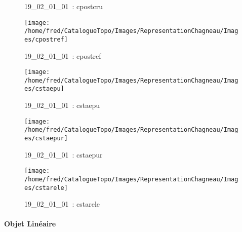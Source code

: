 \documentclass[12pt,titlepage]{book}
\begin{document}
\begin{figure}[h!]
\begin{minipage}[t]{3cm}
\begin{center}
      \caption[~19\_02\_01\_01]{\small{19\_02\_01\_01~:} \tiny{cpostcru}}\label{cpostcru}
    \end{center}
  \end{minipage}
  \begin{minipage}[t]{3cm}
    \begin{center}
      \texttt{[image: /home/fred/CatalogueTopo/Images/RepresentationChagneau/Images/cpostref]}
      \caption[~19\_02\_01\_01]{\small{19\_02\_01\_01~:} \tiny{cpostref}}\label{cpostref}
    \end{center}
  \end{minipage}
  \begin{minipage}[t]{3cm}
    \begin{center}
      \texttt{[image: /home/fred/CatalogueTopo/Images/RepresentationChagneau/Images/cstaepu]}
      \caption[~19\_02\_01\_01]{\small{19\_02\_01\_01~:} \tiny{cstaepu}}\label{cstaepu}
    \end{center}
  \end{minipage}
  \begin{minipage}[t]{3cm}
    \begin{center}
      \texttt{[image: /home/fred/CatalogueTopo/Images/RepresentationChagneau/Images/cstaepur]}
      \caption[~19\_02\_01\_01]{\small{19\_02\_01\_01~:} \tiny{cstaepur}}\label{cstaepur}
    \end{center}
  \end{minipage}
  \begin{minipage}[t]{3cm}
    \begin{center}
      \texttt{[image: /home/fred/CatalogueTopo/Images/RepresentationChagneau/Images/cstarele]}
      \caption[~19\_02\_01\_01]{\small{19\_02\_01\_01~:} \tiny{cstarele}}\label{cstarele}
    \end{center}
  \end{minipage}
\end{figure}


\paragraph{Objet Linéaire}
\noindent
\vspace{\baselineskip}
\end{document}
